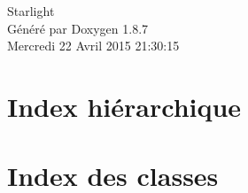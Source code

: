 \documentclass[twoside]{book}
\newcommand{\+}{\discretionary{\mbox{\scriptsize$\hookleftarrow$}}{}{}}
\newcommand{\clearemptydoublepage}{%
  \newpage{\pagestyle{empty}\cleardoublepage}%
}
\begin{document}
\hypersetup{pageanchor=false,
             bookmarks=true,
             bookmarksnumbered=true,
             pdfencoding=unicode
            }
\begin{titlepage}
\vspace*{7cm}
\begin{center}%
{\Large Starlight }\\
\vspace*{1cm}
{\large Généré par Doxygen 1.8.7}\\
\vspace*{0.5cm}
{\small Mercredi 22 Avril 2015 21:30:15}\\
\end{center}
\end{titlepage}
\clearemptydoublepage
\tableofcontents
\clearemptydoublepage
{}
\hypersetup{pageanchor=true}

\chapter{Index hiérarchique}

\chapter{Index des classes}

\end{document}
